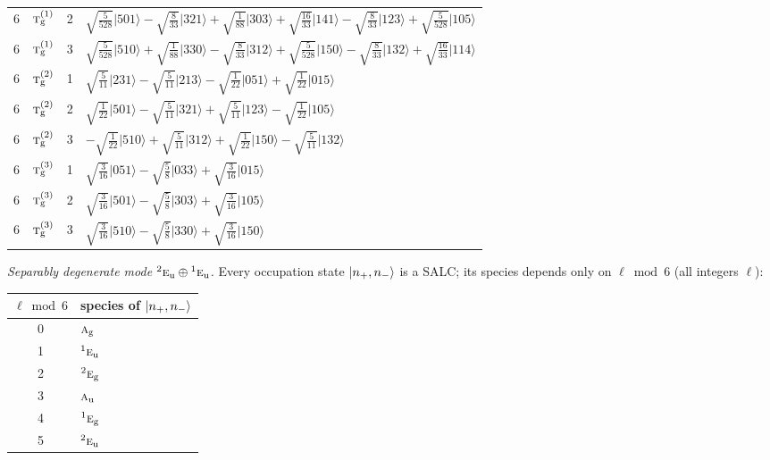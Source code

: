 \documentclass[11pt]{article}
\newcommand{\irr}[1]{\text{\normalfont\scshape #1}}
\newcommand{\conjpair}[1]{{}^{#1}}
\newcommand{\ptag}[1]{\mathrm{#1}}
\newcommand{\occ}[1]{\lvert #1\rangle}
\begin{document}
\begin{longtable}{c l c p{}}
6 & $\irr{t}_{\ptag{g}}^{(1)}$ & 2 & $\sqrt{\tfrac{5}{528}}\occ{501}-\sqrt{\tfrac{8}{33}}\occ{321}+\sqrt{\tfrac{1}{88}}\occ{303}+\sqrt{\tfrac{16}{33}}\occ{141}-\sqrt{\tfrac{8}{33}}\occ{123}+\sqrt{\tfrac{5}{528}}\occ{105}$\\
6 & $\irr{t}_{\ptag{g}}^{(1)}$ & 3 & $\sqrt{\tfrac{5}{528}}\occ{510}+\sqrt{\tfrac{1}{88}}\occ{330}-\sqrt{\tfrac{8}{33}}\occ{312}+\sqrt{\tfrac{5}{528}}\occ{150}-\sqrt{\tfrac{8}{33}}\occ{132}+\sqrt{\tfrac{16}{33}}\occ{114}$\\
6 & $\irr{t}_{\ptag{g}}^{(2)}$ & 1 & $\sqrt{\tfrac{5}{11}}\occ{231}-\sqrt{\tfrac{5}{11}}\occ{213}-\sqrt{\tfrac{1}{22}}\occ{051}+\sqrt{\tfrac{1}{22}}\occ{015}$\\
6 & $\irr{t}_{\ptag{g}}^{(2)}$ & 2 & $\sqrt{\tfrac{1}{22}}\occ{501}-\sqrt{\tfrac{5}{11}}\occ{321}+\sqrt{\tfrac{5}{11}}\occ{123}-\sqrt{\tfrac{1}{22}}\occ{105}$\\
6 & $\irr{t}_{\ptag{g}}^{(2)}$ & 3 & $-\sqrt{\tfrac{1}{22}}\occ{510}+\sqrt{\tfrac{5}{11}}\occ{312}+\sqrt{\tfrac{1}{22}}\occ{150}-\sqrt{\tfrac{5}{11}}\occ{132}$\\
6 & $\irr{t}_{\ptag{g}}^{(3)}$ & 1 & $\sqrt{\tfrac{3}{16}}\occ{051}-\sqrt{\tfrac{5}{8}}\occ{033}+\sqrt{\tfrac{3}{16}}\occ{015}$\\
6 & $\irr{t}_{\ptag{g}}^{(3)}$ & 2 & $\sqrt{\tfrac{3}{16}}\occ{501}-\sqrt{\tfrac{5}{8}}\occ{303}+\sqrt{\tfrac{3}{16}}\occ{105}$\\
6 & $\irr{t}_{\ptag{g}}^{(3)}$ & 3 & $\sqrt{\tfrac{3}{16}}\occ{510}-\sqrt{\tfrac{5}{8}}\occ{330}+\sqrt{\tfrac{3}{16}}\occ{150}$\\
\hline
\end{longtable}

\emph{Separably degenerate mode $\conjpair{2}\irr{e}_{\ptag{u}}\oplus \conjpair{1}\irr{e}_{\ptag{u}}$.} Every occupation state $\ket{n_+,n_-}$ is a SALC; its species depends only on $\ell\bmod 6$ (all integers $\ell$):
\begin{longtable}{c l}\hline $\ell\bmod 6$ & species of $\ket{n_+,n_-}$\\ \hline\endhead
0 & $\irr{a}_{\ptag{g}}$\\
1 & $\conjpair{1}\irr{e}_{\ptag{u}}$\\
2 & $\conjpair{2}\irr{e}_{\ptag{g}}$\\
3 & $\irr{a}_{\ptag{u}}$\\
4 & $\conjpair{1}\irr{e}_{\ptag{g}}$\\
5 & $\conjpair{2}\irr{e}_{\ptag{u}}$\\
\hline\end{longtable}
\end{document}
